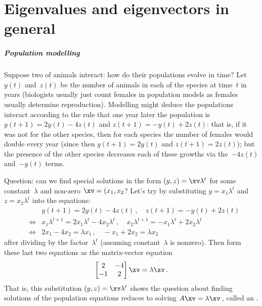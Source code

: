 
\chapter{Eigenvalues and eigenvectors in general}
\label{ch:gee}

\minitoc





\paragraph{Population modelling} 
Suppose two  of animals interact: how do their populations evolve in time?  
Let \(y(t)\) and~\(z(t)\) be the number of  animals in each of the species at time~\(t\) in years (biologists usually just count females in population models as females usually determine reproduction). 
Modelling might deduce the populations interact according to the rule that one year later the population is \(y(t+1)=2y(t)-4z(t)\) and \(z(t+1)=-y(t)+2z(t)\): that is, if it was not for the other species, then for each species the number of females would double every year (since then \(y(t+1)=2y(t)\) and \(z(t+1)=2z(t)\)); but the presence of the other species decreases each of these growths via the~\(-4z(t)\) and~\(-y(t)\) terms.  

Question: can we find special solutions in the form \((y,z)=\xv \lambda^{t}\) for some constant~\(\lambda\) and non-zero \(\xv=(x_1,x_2\)?  
Let's try by substituting \(y=x_1\lambda^{t}\) and \(z=x_2\lambda^{t}\) into the  equations:
\begin{eqnarray*}
&&y(t+1)=2y(t)-4z(t)\,,\quad z(t+1)=-y(t)+2z(t)
\\&\iff& 
x_1 \lambda^{t+1}=2x_1\lambda^{t}-4x_2\lambda^{t}
\,,\quad
x_2 \lambda^{t+1}=-x_1\lambda^{t}+2x_2\lambda^{t}
\\&\iff& 2x_1-4x_2=\lambda x_1
\,,\quad
-x_1+2x_2=\lambda x_2
\end{eqnarray*}
after dividing by the factor~\(\lambda^{t}\) (assuming constant~\(\lambda\) is nonzero).
Then form these last two equations as the matrix-vector equation
\begin{equation*}
\begin{bmatrix} 2&-4\\-1&2 \end{bmatrix}\xv=\lambda\xv\,.
\end{equation*}
That is, this substitution \((y,z)=\xv \lambda^{t}\) shows the question about finding solutions of the population equations reduces to solving \(A\xv=\lambda \xv\)\,, called an .


